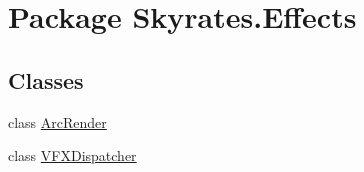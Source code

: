 \hypertarget{namespace_skyrates_1_1_effects}{\section{Package Skyrates.\-Effects}
\label{namespace_skyrates_1_1_effects}
}
\subsection*{Classes}
\begin{DoxyCompactItemize}
\item 
class \hyperlink{class_skyrates_1_1_effects_1_1_arc_render}{Arc\-Render}
\item 
class \hyperlink{class_skyrates_1_1_effects_1_1_v_f_x_dispatcher}{V\-F\-X\-Dispatcher}
\end{DoxyCompactItemize}
